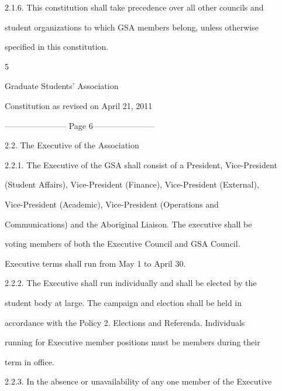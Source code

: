 2.1.6. This  constitution  shall  take  precedence  over  all  other  councils  and  

        student organizations to which GSA members belong, unless otherwise  

        specified in this constitution.  



                                                  

                                                5  



                                Graduate Students’ Association  



                           Constitution as revised on April 21, 2011  


----------------------- Page 6-----------------------

  



2.2.        The Executive of the Association  



2.2.1. The Executive of the GSA shall consist of a President, Vice-President  

        (Student Affairs), Vice-President (Finance), Vice-President (External),  

        Vice-President          (Academic),         Vice-President         (Operations         and  

        Communications) and the Aboriginal Liaison. The executive shall be  

        voting  members  of  both  the  Executive  Council  and  GSA  Council.  

        Executive terms shall run from May 1 to April 30.  



2.2.2. The  Executive  shall  run  individually  and  shall  be  elected  by  the  

        student  body  at  large.  The  campaign  and  election  shall  be  held  in  

        accordance  with  the  Policy  2.  Elections  and  Referenda.  Individuals  

        running for Executive member positions must be members during their  

        term in office.  



2.2.3. In the absence or unavailability of any one member of the Executive  

